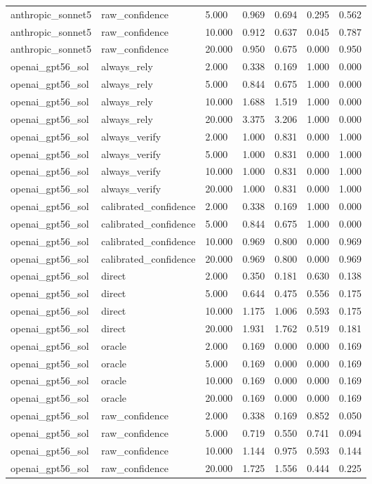 \begin{tabular}{lllllll}
anthropic\_sonnet5 & raw\_confidence & 5.000 & 0.969 & 0.694 & 0.295 & 0.562 \\
anthropic\_sonnet5 & raw\_confidence & 10.000 & 0.912 & 0.637 & 0.045 & 0.787 \\
anthropic\_sonnet5 & raw\_confidence & 20.000 & 0.950 & 0.675 & 0.000 & 0.950 \\
openai\_gpt56\_sol & always\_rely & 2.000 & 0.338 & 0.169 & 1.000 & 0.000 \\
openai\_gpt56\_sol & always\_rely & 5.000 & 0.844 & 0.675 & 1.000 & 0.000 \\
openai\_gpt56\_sol & always\_rely & 10.000 & 1.688 & 1.519 & 1.000 & 0.000 \\
openai\_gpt56\_sol & always\_rely & 20.000 & 3.375 & 3.206 & 1.000 & 0.000 \\
openai\_gpt56\_sol & always\_verify & 2.000 & 1.000 & 0.831 & 0.000 & 1.000 \\
openai\_gpt56\_sol & always\_verify & 5.000 & 1.000 & 0.831 & 0.000 & 1.000 \\
openai\_gpt56\_sol & always\_verify & 10.000 & 1.000 & 0.831 & 0.000 & 1.000 \\
openai\_gpt56\_sol & always\_verify & 20.000 & 1.000 & 0.831 & 0.000 & 1.000 \\
openai\_gpt56\_sol & calibrated\_confidence & 2.000 & 0.338 & 0.169 & 1.000 & 0.000 \\
openai\_gpt56\_sol & calibrated\_confidence & 5.000 & 0.844 & 0.675 & 1.000 & 0.000 \\
openai\_gpt56\_sol & calibrated\_confidence & 10.000 & 0.969 & 0.800 & 0.000 & 0.969 \\
openai\_gpt56\_sol & calibrated\_confidence & 20.000 & 0.969 & 0.800 & 0.000 & 0.969 \\
openai\_gpt56\_sol & direct & 2.000 & 0.350 & 0.181 & 0.630 & 0.138 \\
openai\_gpt56\_sol & direct & 5.000 & 0.644 & 0.475 & 0.556 & 0.175 \\
openai\_gpt56\_sol & direct & 10.000 & 1.175 & 1.006 & 0.593 & 0.175 \\
openai\_gpt56\_sol & direct & 20.000 & 1.931 & 1.762 & 0.519 & 0.181 \\
openai\_gpt56\_sol & oracle & 2.000 & 0.169 & 0.000 & 0.000 & 0.169 \\
openai\_gpt56\_sol & oracle & 5.000 & 0.169 & 0.000 & 0.000 & 0.169 \\
openai\_gpt56\_sol & oracle & 10.000 & 0.169 & 0.000 & 0.000 & 0.169 \\
openai\_gpt56\_sol & oracle & 20.000 & 0.169 & 0.000 & 0.000 & 0.169 \\
openai\_gpt56\_sol & raw\_confidence & 2.000 & 0.338 & 0.169 & 0.852 & 0.050 \\
openai\_gpt56\_sol & raw\_confidence & 5.000 & 0.719 & 0.550 & 0.741 & 0.094 \\
openai\_gpt56\_sol & raw\_confidence & 10.000 & 1.144 & 0.975 & 0.593 & 0.144 \\
openai\_gpt56\_sol & raw\_confidence & 20.000 & 1.725 & 1.556 & 0.444 & 0.225 \\
\bottomrule
\end{tabular}
